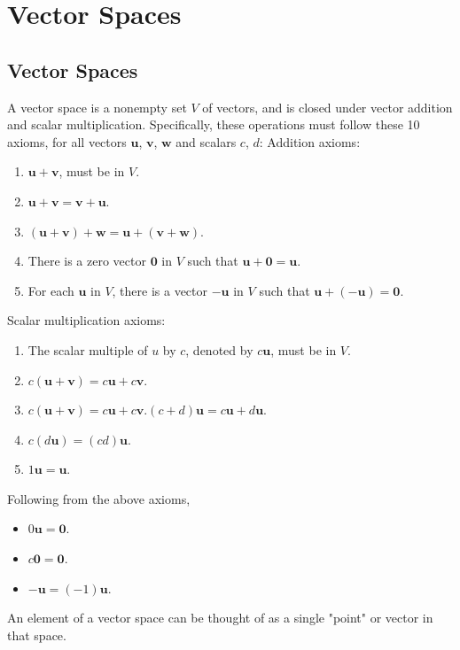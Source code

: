 \documentclass[../linear-algebra.tex]{subfiles}
\begin{document}
\section{Vector Spaces}

\subsection{Vector Spaces}
A vector space is a nonempty set $V$ of vectors, and is closed under vector addition and scalar multiplication.
Specifically, these operations must follow these 10 axioms, for all vectors $\mathbf{u}$, $\mathbf{v}$, $\mathbf{w}$ and scalars $c$, $d$:\newline
Addition axioms:
\begin{enumerate}
    \item $\mathbf{u}+\mathbf{v}$, must be in $V$.
    \item $\mathbf{u}+\mathbf{v}=\mathbf{v}+\mathbf{u}$.
    \item $(\mathbf{u}+\mathbf{v})+\mathbf{w}=\mathbf{u}+(\mathbf{v}+\mathbf{w})$.
    \item There is a zero vector $\mathbf{0}$ in $V$ such that $\mathbf{u}+\mathbf{0}=\mathbf{u}$.
    \item For each $\mathbf{u}$ in $V$, there is a vector $-\mathbf{u}$ in $V$ such that $\mathbf{u}+(-\mathbf{u})=\mathbf{0}$.
\end{enumerate}
Scalar multiplication axioms:
\begin{enumerate}
    \item The scalar multiple of $u$ by $c$, denoted by $c\mathbf{u}$, must be in $V$.
    \item $c(\mathbf{u}+\mathbf{v})=c\mathbf{u}+c\mathbf{v}$.
    \item $c(\mathbf{u}+\mathbf{v})=c\mathbf{u}+c\mathbf{v}$.$(c+d)\mathbf{u}=c\mathbf{u}+d\mathbf{u}$.
    \item $c(d\mathbf{u})=(cd)\mathbf{u}$.
    \item $1\mathbf{u}=\mathbf{u}$.
\end{enumerate}
Following from the above axioms,
\begin{itemize}
    \item $0\mathbf{u}=\mathbf{0}$.
    \item $c\mathbf{0}=\mathbf{0}$.
    \item $-\mathbf{u}=(-1)\mathbf{u}$.
\end{itemize}
An element of a vector space can be thought of as a single "point" or vector in that space.\newline
\end{document}

